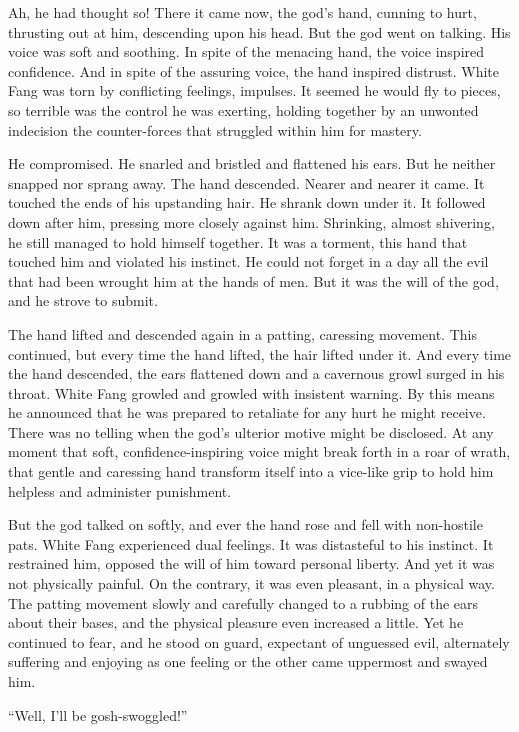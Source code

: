 \documentclass[10pt]{book}
\begin{document}
Ah, he had thought so! There it came now, the god’s hand, cunning to
hurt, thrusting out at him, descending upon his head. But the god went
on talking. His voice was soft and soothing. In spite of the menacing
hand, the voice inspired confidence. And in spite of the assuring
voice, the hand inspired distrust. White Fang was torn by conflicting
feelings, impulses. It seemed he would fly to pieces, so terrible was
the control he was exerting, holding together by an unwonted indecision
the counter-forces that struggled within him for mastery.

He compromised. He snarled and bristled and flattened his ears. But he
neither snapped nor sprang away. The hand descended. Nearer and nearer
it came. It touched the ends of his upstanding hair. He shrank down
under it. It followed down after him, pressing more closely against
him. Shrinking, almost shivering, he still managed to hold himself
together. It was a torment, this hand that touched him and violated his
instinct. He could not forget in a day all the evil that had been
wrought him at the hands of men. But it was the will of the god, and he
strove to submit.

The hand lifted and descended again in a patting, caressing movement.
This continued, but every time the hand lifted, the hair lifted under
it. And every time the hand descended, the ears flattened down and a
cavernous growl surged in his throat. White Fang growled and growled
with insistent warning. By this means he announced that he was prepared
to retaliate for any hurt he might receive. There was no telling when
the god’s ulterior motive might be disclosed. At any moment that soft,
confidence-inspiring voice might break forth in a roar of wrath, that
gentle and caressing hand transform itself into a vice-like grip to
hold him helpless and administer punishment.

But the god talked on softly, and ever the hand rose and fell with
non-hostile pats. White Fang experienced dual feelings. It was
distasteful to his instinct. It restrained him, opposed the will of him
toward personal liberty. And yet it was not physically painful. On the
contrary, it was even pleasant, in a physical way. The patting movement
slowly and carefully changed to a rubbing of the ears about their
bases, and the physical pleasure even increased a little. Yet he
continued to fear, and he stood on guard, expectant of unguessed evil,
alternately suffering and enjoying as one feeling or the other came
uppermost and swayed him.

“Well, I’ll be gosh-swoggled!”
\end{document}
